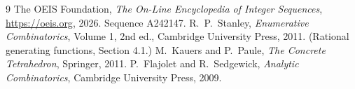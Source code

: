 \documentclass[11pt,a4paper]{article}
\theoremstyle{plain}
\theoremstyle{definition}
\begin{document}
\begin{thebibliography}{9}
 The OEIS Foundation, \emph{The On-Line Encyclopedia of Integer
Sequences}, \url{https://oeis.org}, 2026. Sequence A242147.
 R.~P.~Stanley, \emph{Enumerative Combinatorics}, Volume 1, 2nd ed.,
Cambridge University Press, 2011. (Rational generating functions, Section 4.1.)
 M.~Kauers and P.~Paule, \emph{The Concrete Tetrahedron}, Springer, 2011.
 P.~Flajolet and R.~Sedgewick, \emph{Analytic Combinatorics}, Cambridge
University Press, 2009.
\end{thebibliography}
\end{document}
